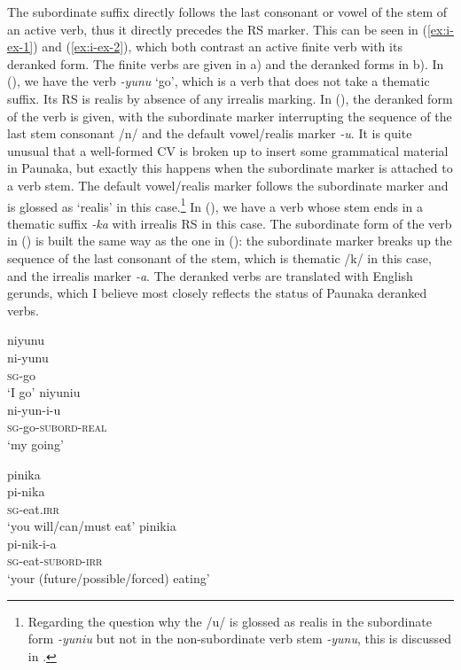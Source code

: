 The subordinate suffix directly follows the last consonant or vowel of the stem of an active verb, thus it directly precedes the RS marker. This  can be seen in (\ref{ex:i-ex-1}) and (\ref{ex:i-ex-2}), which both contrast an active finite verb with its deranked form. The finite verbs are given in a) and the deranked forms in b). In (), we have the verb \textit{-yunu} ‘go’, which is a verb that does not take a thematic suffix. Its RS is realis by absence of any irrealis marking. In (), the deranked form of the verb is given, with the subordinate marker interrupting the sequence of the last stem consonant /n/ and the default vowel/realis marker \textit{-u}. It is quite unusual that a well-formed CV  is broken up to insert some grammatical material in Paunaka, but exactly this happens when the subordinate marker is attached to a verb stem. The default vowel/realis marker follows the subordinate marker and is glossed as ‘realis’ in this case.\footnote{Regarding the question why the /u/ is glossed as realis in the subordinate form \textit{-yuniu} but not in the non-subordinate verb stem \textit{-yunu}, this is discussed in .} In (), we have a verb whose stem ends in a thematic suffix  \textit{-ka} with irrealis RS in this case. The subordinate form of the verb in () is built the same way as the one in (): the subordinate marker breaks up the sequence of the last consonant of the stem, which is thematic /k/ in this case, and the irrealis marker \textit{-a}. The deranked verbs are translated with English gerunds, which I believe most closely reflects the status of Paunaka deranked verbs.


\ea\label{ex:i-ex-1}
  \ea\label{ex:i-ex-1.1}
\begingl
\glpreamble niyunu\\
\gla ni-yunu\\
\textsc{sg}-go\\
\glft ‘I go’
\endgl
  \ex\label{ex:i-ex-1.2}
\begingl
\glpreamble niyuniu\\
\gla ni-yun-i-u\\
\textsc{sg}-go-\textsc{subord}-\textsc{real}\\
\glft ‘my going’
\endgl
\z
\xe


\ea\label{ex:i-ex-2}
  \ea\label{ex:i-ex-2.1}
\begingl
\glpreamble pinika\\
\gla pi-nika\\
\textsc{sg}-eat.\textsc{irr}\\
\glft ‘you will/can/must eat’
\endgl
  \ex\label{ex:i-ex-2.2}
\begingl
\glpreamble pinikia\\
\gla pi-nik-i-a\\
\textsc{sg}-eat-\textsc{subord}-\textsc{irr}\\
\glft ‘your (future/possible/forced) eating’
\endgl
\z
\xe


